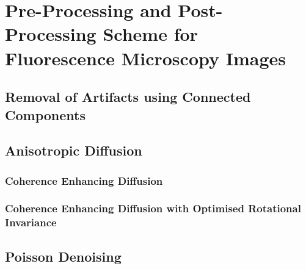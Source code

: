 
\chapter{Pre-Processing and Post-Processing Scheme for Fluorescence Microscopy Images} %

\label{chap:Chapter7} %


\section{Removal of Artifacts using Connected Components}



\section{Anisotropic Diffusion}


\subsection{Coherence Enhancing Diffusion}



\subsection{Coherence Enhancing Diffusion with Optimised Rotational Invariance}



\section{Poisson Denoising}
\label{sec:PoissonDenoising}


